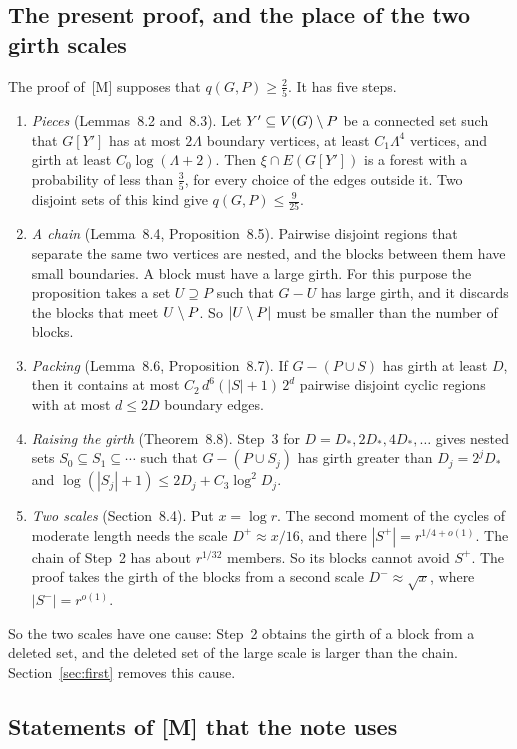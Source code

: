 \documentclass[11pt]{article}
\begin{document}
\subsection{The present proof, and the place of the two girth scales}\label{sec:present}

The proof of~[M] supposes that $q(G,P)\ge\frac25$. It has five steps.
\begin{enumerate}[leftmargin=1.6em]
\item \emph{Pieces} (Lemmas~8.2 and~8.3). Let $Y'\subseteq V(G)\setminus P$ be a connected set such
that $G[Y']$ has at most $2\Lambda$ boundary vertices, at least $C_1\Lambda^{4}$ vertices, and
girth at least $C_0\log(\Lambda+2)$. Then $\xi\cap E(G[Y'])$ is a forest with a probability of
less than $\frac35$, for every choice of the edges outside it. Two disjoint sets of this kind give
$q(G,P)\le\frac9{25}$.
\item \emph{A chain} (Lemma~8.4, Proposition~8.5). Pairwise disjoint regions that separate the
same two vertices are nested, and the blocks between them have small boundaries. A block must have
a large girth. For this purpose the proposition takes a set $U\supseteq P$ such that $G-U$ has
large girth, and it discards the blocks that meet $U\setminus P$. So $|U\setminus P|$ must be smaller than the
number of blocks.
\item \emph{Packing} (Lemma~8.6, Proposition~8.7). If $G-(P\cup S)$ has girth at least $D$, then
it contains at most $C_2\,d^{6}(|S|+1)\,2^{d}$ pairwise disjoint cyclic regions with at most
$d\le2D$ boundary edges.
\item \emph{Raising the girth} (Theorem~8.8). Step~3 for $D=D_*,2D_*,4D_*,\dots$ gives nested
sets $S_0\subseteq S_1\subseteq\cdots$ such that $G-(P\cup S_j)$ has girth greater than
$D_j=2^{j}D_*$ and $\log(|S_j|+1)\le2D_j+C_3\log^{2}D_j$.
\item \emph{Two scales} (Section~8.4). Put $x=\log r$. The second moment of the cycles of
moderate length needs the scale $D^{+}\approx x/16$, and there $|S^{+}|=r^{1/4+o(1)}$. The chain
of Step~2 has about $r^{1/32}$ members. So its blocks cannot avoid $S^{+}$. The proof takes the
girth of the blocks from a second scale $D^{-}\approx\sqrt x$, where $|S^{-}|=r^{o(1)}$.
\end{enumerate}
So the two scales have one cause: Step~2 obtains the girth of a block from a deleted set, and the
deleted set of the large scale is larger than the chain. Section~\ref{sec:first} removes this
cause.

\subsection{Statements of [M] that the note uses}\label{sec:used}
\end{document}
